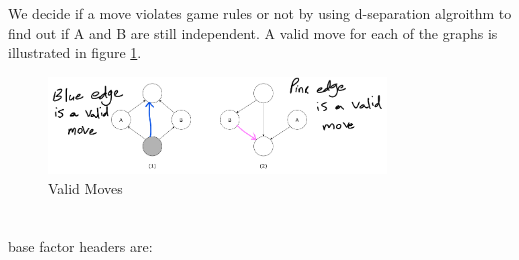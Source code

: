 \documentclass[en]{university}
\begin{document}
\setupdocument

\section{}

\subsection{}

We decide if a move violates game rules or not by using d-separation algroithm to find out 
if A and B are still independent. A valid move for each of the graphs is illustrated in 
figure \ref{fig:validmoves}.

\begin{figure}
    \centering
    \includegraphics[width=0.8\textwidth]{assets/1-a.png}
    \caption{Valid Moves}
    \label{fig:validmoves}
\end{figure}

\subsection{}

\section{}

base factor headers are:
\end{document}
